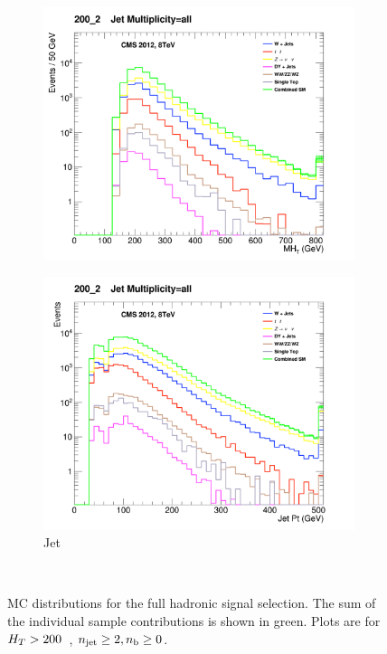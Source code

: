 \begin{figure}[!ht]
    \begin{subfigure}[b]{0.48\textwidth}
      \includegraphics[width=\textwidth]{Figs/datamc/had/v1/MHT_all_200_upwards}
      \caption{\mht}
    \end{subfigure}
    \begin{subfigure}[b]{0.48\textwidth}
      \includegraphics[width=\textwidth]{Figs/datamc/had/v1/CommonJetPt_all_200_upwards}
      \caption{Jet \Pt}
    \end{subfigure} \\
    \caption{\label{fig:datamc_had_inc}
    MC distributions for the full hadronic signal selection. The 
    sum of the individual sample contributions is shown in green. Plots
    are for $H_T>200$~\gev, $n_{\text{jet}}\geq2, n_{\text{b}}\geq0$.
    }
\end{figure}

